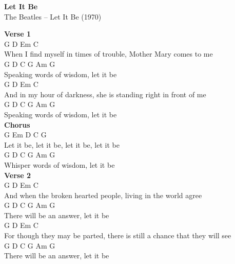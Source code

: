 \documentclass[a4paper]{article}
\begin{document}
    \begin{center}
        \textbf{Let It Be}
        ~\\
        The Beatles -- Let It Be (1970)
    \end{center}
    {
        \scriptsize
        \textbf{Verse 1}
        ~\\
        {
            \cutive
            \obeyspaces
       G              D                 Em          C
\\
When I find myself in times of trouble, Mother Mary comes to me
\\
G                 D              C G Am G
\\
Speaking words of wisdom, let it be
\\
    G             D                Em                C
\\
And in my hour of darkness, she is standing right in front of me
\\
G                 D              C G Am G
\\
Speaking words of wisdom, let it be
\\

        }
        \textbf{Chorus}
        ~\\
        {
            \cutive
            \obeyspaces
G      Em         D          C          G
\\
Let it be, let it be, let it be, let it be
\\
G                D              C G Am G
\\
Whisper words of wisdom, let it be
\\

        }
        \textbf{Verse 2}
        ~\\
        {
            \cutive
            \obeyspaces
    G               D               Em            C
\\
And when the broken hearted people, living in the world agree
\\
G                D              C G Am G
\\
There will be an answer, let it be
\\
    G                  D                Em                  C
\\
For though they may be parted, there is still a chance that they will see
\\
G                D              C G Am G
\\
There will be an answer, let it be
\\

}}
\end{document}
